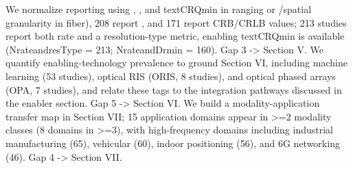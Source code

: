  We normalize reporting using , , and \markdownRendererDollarSign{}\markdownRendererBackslash{}text\markdownRendererLeftBrace{}CRQ\markdownRendererRightBrace{}\markdownRendererLeftBrace{}\markdownRendererBackslash{}min\markdownRendererRightBrace{}\markdownRendererDollarSign{} in ranging or /spatial granularity in fiber), 208 report , and 171 report CRB/CRLB values; 213 studies report both rate and a resolution-type metric, enabling \markdownRendererDollarSign{}\markdownRendererBackslash{}text\markdownRendererLeftBrace{}CRQ\markdownRendererRightBrace{}\markdownRendererLeftBrace{}\markdownRendererBackslash{}min\markdownRendererRightBrace{}\markdownRendererDollarSign{} is available (N\markdownRendererUnderscore{}rate\markdownRendererUnderscore{}and\markdownRendererUnderscore{}resType = 213; N\markdownRendererUnderscore{}rate\markdownRendererUnderscore{}and\markdownRendererUnderscore{}Drmin = 160).  Gap 3 -> Section V.\markdownRendererOlItemEnd 
{} We quantify enabling-technology prevalence to ground Section VI, including machine learning (53 studies), optical RIS (ORIS, 8 studies), and optical phased arrays (OPA, 7 studies), and relate these tags to the integration pathways discussed in the enabler section.  Gap 5 -> Section VI.\markdownRendererOlItemEnd 
{} We build a modality-application transfer map in Section VII; 15 application domains appear in >=2 modality classes (8 domains in >=3), with high-frequency domains including industrial manufacturing (65), vehicular (60), indoor positioning (56), and 6G networking (46).  Gap 4 -> Section VII.\markdownRendererOlItemEnd 
